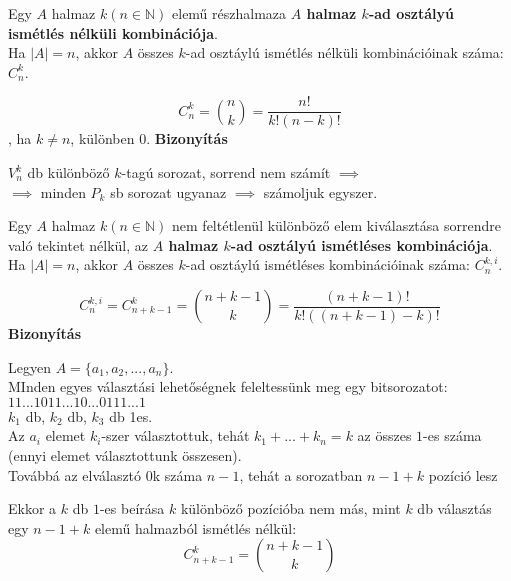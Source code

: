 \begin{frame}
  \begin{tcolorbox}[title={Def.: Ismétlés nélküli Kombináció}]
    Egy $A$ halmaz $k (n \in \mathbb{N})$ elemű részhalmaza \textbf{$A$ halmaz  $k$-ad osztályú ismétlés nélküli kombinációja}.\\
    Ha $|A| = n$, akkor $A$ összes $k$-ad osztáylú ismétlés nélküli kombinációinak száma: $C_n^k$.
  \end{tcolorbox}

  \begin{tcolorbox}[title={Tétel: Kombinációk száma}]
    $$C_n^k = {{n}\choose{k}} = \frac{n!}{k!(n - k)!} $$, ha $k \neq n$, különben 0.
  \tcblower
    \textbf{Bizonyítás}\\
    \mmedskip

    $V_n^k$ db különböző $k$-tagú sorozat, sorrend nem számít $\implies$\\
    $\implies$ minden $P_k$ sb sorozat ugyanaz $\implies$ számoljuk egyszer.\\
  \end{tcolorbox}
\end{frame}

\begin{frame}
  \begin{tcolorbox}[title={Def.: Ismétléses Kombináció}]
    Egy $A$ halmaz $k (n \in \mathbb{N})$ nem feltétlenül különböző elem kiválasztása sorrendre való tekintet nélkül, az \textbf{$A$ halmaz  $k$-ad osztályú ismétléses kombinációja}.\\
    Ha $|A| = n$, akkor $A$ összes $k$-ad osztáylú ismétléses kombinációinak száma: $C_n^{k, i}$.
  \end{tcolorbox}

  \begin{tcolorbox}[title={Tétel: Ismétléses kombinációk száma}]
    $$C_n^{k, i} = C_{n + k -1}^k = {{n + k - 1}\choose{k}} = \frac{(n + k - 1)!}{k!((n + k - 1) - k)!}$$
  \tcblower
    \textbf{Bizonyítás}\\
    \mmedskip

    Legyen $A = \{a_1, a_2, ..., a_n\}$.\\
    MInden egyes választási lehetőségnek feleltessünk meg egy bitsorozatot:\\
    $1 1 ... 1 0 1 1 ... 1 0 ... 0 1 1 1 ... 1$\\
    $k_1$ db,    $k_2$ db,         $k_3$ db 1es.\\
    Az $a_i$ elemet $k_i$-szer választottuk, tehát $k_1 + ... + k_n = k$ az összes $1$-es száma (ennyi elemet választottunk összesen).\\
    Továbbá az elválasztó $0$k száma $n - 1$, tehát a sorozatban $n - 1 + k$ pozíció lesz\\
    \mmedskip

    Ekkor a $k$ db $1$-es beírása $k$ különböző pozícióba nem más, mint $k$ db választás egy $n - 1 + k$ elemű halmazból ismétlés nélkül:\\
    $$C_{n + k - 1}^k = {n + k - 1 \choose k}$$
  \end{tcolorbox}
\end{frame}


